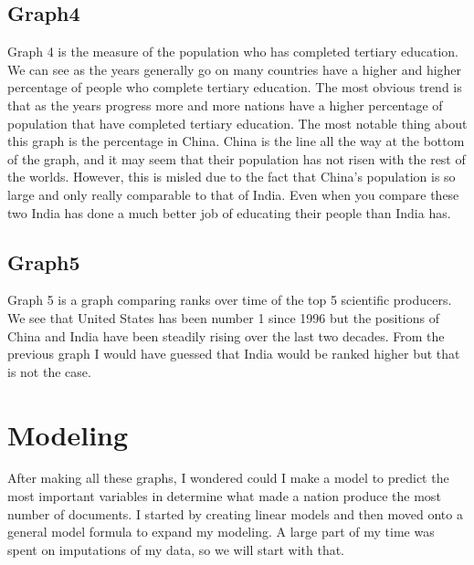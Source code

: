 \documentclass{article}\usepackage[]{graphicx}\usepackage[]{color}
\begin{document}
\subsection{Graph4}
Graph 4 is the measure of the population who has completed tertiary education. We can see as the years generally go on many countries have a higher and higher percentage of people who complete tertiary education. The most obvious trend is that as the years progress more and more nations have a higher percentage of population that have completed tertiary education. The most notable thing about this graph is the percentage in China. China is the line all the way at the bottom of the graph, and it may seem that their population has not risen with the rest of the worlds. However, this is misled due to the fact that China's population is so large and only really comparable to that of India. Even when you compare these two India has done a much better job of educating their people than India has.
\subsection{Graph5}
Graph 5 is a graph comparing ranks over time of the top 5 scientific producers. We see that United States has been number 1 since 1996 but the positions of China and India have been steadily rising over the last two decades. From the previous graph I would have guessed that India would be ranked higher but that is not the case.
\section{Modeling}
After making all these graphs, I wondered could I make a model to predict the most important variables in determine what made a nation produce the most number of documents. I started by creating linear models and then moved onto a general model formula to expand my modeling. A large part of my time was spent on imputations of my data, so we will start with that.
\end{document}
